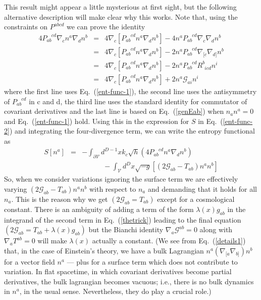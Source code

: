 \documentclass[12pt]{iopart}
\def\eq#1{{Eq.~(\ref{#1})}}
\newcommand{\Cal}[1]{\ensuremath{\mathcal{#1}}}
\newcommand{\ph}[1]{\phantom{#1}}
\newcommand{\D}{\ensuremath{\nabla}}
\begin{document}
This result might appear a little mysterious at first sight, but the following alternative description will make clear why this works.
Note that, using the constraints on $P^{abcd}$ we can prove the identity
\begin{eqnarray}
\label{details1}
4P_{ab}^{\ph{a}\ph{b}cd} \D_cn^a\D_dn^b&=&
4\D_c[P_{ab}^{\ph{a}\ph{b}cd} n^a\D_dn^b]-4n^aP_{ab}^{\ph{a}\ph{b}cd} \D_c\D_dn^b\nonumber\\
&=&4\D_c[P_{ab}^{\ph{a}\ph{b}cd} n^a\D_dn^b]-2n^aP_{ab}^{\ph{a}\ph{b}cd} \D_{[c}\D_{d]}n^b\nonumber\\
&=&4\D_c[P_{ab}^{\ph{a}\ph{b}cd} n^a\D_dn^b]-2n^aP_{ab}^{\ph{a}\ph{b}cd} R^b_{\phantom{b}icd}n^i\nonumber\\
&=&4\D_c[P_{ab}^{\ph{a}\ph{b}cd} n^a\D_dn^b]+2n^a\mathcal{G}_{ai}n^i
\end{eqnarray} 
where the first line uses \eq{ent-func-1}, the second line uses the antisymmetry of $P_{ab}^{\ph{a}\ph{b}cd}$ in c and d, the third line uses the standard identity for commutator of covariant derivatives and the last line is based on 
\eq{genEab} when $n_an^a=0$ and \eq{ent-func-1} hold. Using this in the expression for
 $S$ in \eq{ent-func-2} and integrating the four-divergence term, we can write
 the entropy functional as
\begin{eqnarray}
S[n^a]&=&-\int_{\partial\Cal{V}}{d^{D-1}x k_c\sqrt{h}}
\left(4P_{ab}^{\ph{a}\ph{b}cd} n^a\D_dn^b\right)\nonumber\\
&& \qquad \quad -\int_\Cal{V}{d^Dx\sqrt{-g}}\left[(2\mathcal{G}_{ab}-T_{ab})n^an^b\right]
\label{thetrick}
\end{eqnarray}
So, when we consider variations ignoring the surface term we are  effectively varying $(2\mathcal{G}_{ab}-T_{ab})n^an^b$ with respect to $n_a$ and demanding that it holds for all $n_a$. This is the reason why  we get  $(2\mathcal{G}_{ab}=T_{ab})$ except for a cosmological constant.
There is an ambiguity of adding a term of the form $\lambda(x)g_{ab}$ in the integrand of the second term in \eq{thetrick} leading to the final equation
$(2\mathcal{G}_{ab}=T_{ab}+\lambda(x)g_{ab})$ but the Bianchi identity $\nabla_a\mathcal{G}^{ab}=0$ along with
$\nabla_aT^{ab}=0$ will make $\lambda(x)$ actually a constant. 
(We see from \eq{details1}
that, in the case of Einstein's theory, we have a bulk Lagrangian $n^a(\nabla_{[a}\nabla_{b]})n^b$ for a vector field $n^a$
--- plus for  a surface term which does not contribute to variation. 
In flat spacetime, in which covariant derivatives become partial derivatives, the bulk lagrangian becomes vacuous; i.e., there is  no bulk dynamics in $n^a$, in the usual sense. Nevertheless, they do play a crucial role.) 
\end{document}
